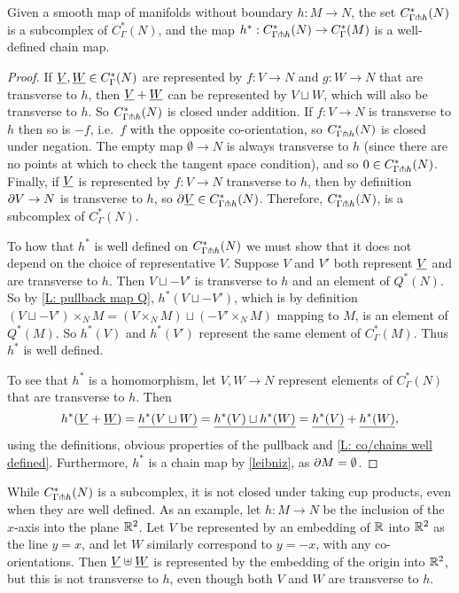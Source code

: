 \begin{proposition}
Given a smooth map of manifolds without boundary $h \colon M \to N$, the set $C^*_{\Gamma\pitchfork h}(N)$ is a subcomplex of $C^*_{\Gamma}(N)$, and the map $h^*:C^*_{\Gamma\pitchfork h}(N) \to C^*_{\Gamma}(M)$ is a well-defined chain map.
\end{proposition}
\begin{proof}
If $\underline{V},\underline{W} \in C^*_\Gamma(N)$ are represented by $f \colon V \to N$ and $g \colon W \to N$ that are transverse to $h$, then $\underline{V}+\underline{W}$ can be represented by $V \sqcup W$, which will also be transverse to $h$. So $C^*_{\Gamma\pitchfork h}(N)$ is closed under addition. If $f \colon V \to N$ is transverse to $h$ then so is $-f$, i.e.\ $f$ with the opposite co-orientation, so $C^*_{\Gamma\pitchfork h}(N)$ is closed under negation. The empty map $\emptyset \to N$ is always transverse to $h$ (since there are no points at which to check the tangent space condition), and so $0 \in C^*_{\Gamma\pitchfork h}(N)$. Finally, if $\underline{V}$ is represented by $f \colon V \to N$ transverse to $h$, then by definition $\partial V \to N$ is transverse to $h$, so $\partial \underline{V} \in C^*_{\Gamma\pitchfork h}(N)$. Therefore, $C^*_{\Gamma\pitchfork h}(N)$, is a subcomplex of $C^*_{\Gamma}(N)$.

To how that $h^*$ is well defined on $C^*_{\Gamma\pitchfork h}(N)$ we must show that it does not depend on the choice of representative $V$. Suppose $V$ and $V'$ both represent $\underline{V}$ and are transverse to $h$. Then $V \sqcup -V'$ is transverse to $h$ and an element of $Q^*(N)$. So by \cref{L: pullback map Q}, $h^*(V \sqcup -V')$, which is by definition $(V \sqcup -V')\times_NM = (V\times_NM) \sqcup (-V'\times_NM)$ mapping to $M$, is an element of $Q^*(M)$. So $h^*(V)$ and $h^*(V')$ represent the same element of $C^*_{\Gamma}(M)$. Thus $h^*$ is well defined.

To see that $h^*$ is a homomorphism, let $V,W \to N$ represent elements of $C^*_{\Gamma}(N)$ that are transverse to $h$. Then
$$h^*(\underline{V}+\underline{W}) = \underline{h^*(V \sqcup W)} = \underline{h^*(V) \sqcup h^*(W)} = \underline{h^*(V)}+\underline{h^*(W)},$$
using the definitions, obvious properties of the pullback and \cref{L: co/chains well defined}. Furthermore, $h^*$ is a chain map by \cref{leibniz}, as $\partial M = \emptyset$.
\end{proof}



\begin{remark}
While $C^*_{\Gamma\pitchfork h}(N)$ is a subcomplex, it is not closed under taking cup products, even when they are well defined. As an example, let $h \colon M \to N$ be the inclusion of the $x$-axis into the plane $\mathbb{R}^2$. Let $V$ be represented by an embedding of $\mathbb{R}$ into $\mathbb{R}^2$ as the line $y = x$, and let $W$ similarly correspond to $y = -x$, with any co-orientations. Then $\underline{V} \uplus \underline{W}$ is represented by the embedding of the origin into $\mathbb{R}^2$, but this is not transverse to $h$, even though both $V$ and $W$ are transverse to $h$.
\end{remark}


